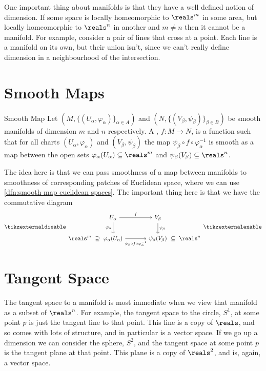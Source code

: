 \documentclass[fleqn]{NotesClass}
\begin{document}
    One important thing about manifolds is that they have a well defined notion of dimension.
    If some space is locally homeomorphic to \(\reals^m\) in some area, but locally homeomorphic to \(\reals^n\) in another and \(m \ne n\) then it cannot be a manifold.
    For example, consider a pair of lines that cross at a point.
    Each line is a manifold on its own, but their union isn't, since we can't really define dimension in a neighbourhood of the intersection.
    
    \section{Smooth Maps}
    \begin{dfn}{Smooth Map}{}
        Let \((M, \{(U_\alpha, \varphi_\alpha)\}_{\alpha \in A})\) and \((N, \{(V_\beta, \psi_\beta)\}_{\beta \in B})\) be smooth manifolds of dimension \(m\) and \(n\) respectively.
        A , \(f \colon M \to N\), is a function such that for all charts \((U_\alpha, \varphi_\alpha)\) and \((V_\beta, \psi_\beta)\) the map \(\psi_\beta \circ f \circ \varphi_\alpha^{-1}\) is smooth as a map between the open sets \(\varphi_\alpha(U_\alpha) \subseteq \reals^m\) and \(\psi_\beta(V_\beta) \subseteq \reals^n\).
    \end{dfn}
    
    The idea here is that we can pass smoothness of a map between manifolds to smoothness of corresponding patches of Euclidean space, where we can use \cref{dfn:smooth map euclidean spaces}.
    The important thing here is that we have the commutative diagram
    \begin{equation}
        \tikzexternaldisable
        \begin{tikzcd}[column sep=small]
            & U_\alpha \arrow[rrr, "f"] \arrow[d, "\varphi_\alpha"'] &&& V_\beta \arrow[d, "\psi_\beta"]\\
            \reals^m \arrow[r, phantom, "\supseteq"] & \varphi_\alpha(U_\alpha) \arrow[rrr, "\psi_\beta \circ f \circ \varphi_\alpha^{-1}"'{yshift=-0.05cm}] &&& \psi_\beta(V_\beta) \arrow[r, phantom, "\subseteq"] & \reals^n
        \end{tikzcd}
        \tikzexternalenable
    \end{equation}
    
    \section{Tangent Space}
    The tangent space to a manifold is most immediate when we view that manifold as a subset of \(\reals^n\).
    For example, the tangent space to the circle, \(S^1\), at some point \(p\) is just the tangent line to that point.
    This line is a copy of \(\reals\), and so comes with lots of structure, and in particular is a vector space.
    If we go up a dimension we can consider the sphere, \(S^2\), and the tangent space at some point \(p\) is the tangent plane at that point.
    This plane is a copy of \(\reals^2\), and is, again, a vector space.
    
\end{document}
